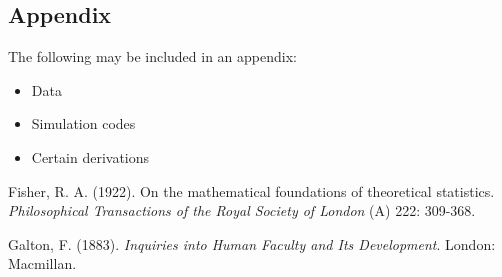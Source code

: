 \documentclass[12pt]{article}
\begin{document}
\begin{appendix}
\section{Appendix}

\vspace{4mm}\noindent 
The following may be included in an appendix:

\begin{itemize}
\item[] Data 
\item[] Simulation codes
\item[] Certain derivations
\end{itemize}
\end{appendix}
\newpage

\begin{thebibliography}{99}

 Fisher, R. A. (1922). On the mathematical foundations of
theoretical statistics. {\it Philosophical Transactions of the Royal
Society of London} (A) 222: 309-368.

Galton, F. (1883). {\it Inquiries into Human Faculty and Its
Development}. London: Macmillan.

\end{thebibliography}
\end{document}

